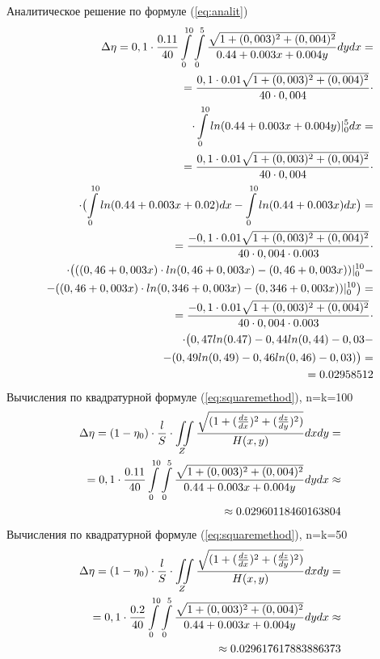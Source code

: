 \documentclass{article}
\begin{document}
Аналитическое решение по формуле (\ref{eq:analit})
\begin{align}\label{eq:analit1:max}
\Delta \eta = 0,1 \cdot \frac{0.11}{40} \int\limits_0^{10} \int\limits_0^5 \frac{\sqrt{1+(0,003)^2+(0,004)^2}}{0.44 + 0.003x + 0.004y} dy dx = \notag \\
= \frac{0,1 \cdot 0.01\sqrt{1+(0,003)^2+(0,004)^2}}{40 \cdot 0,004} \cdot \notag \\
\cdot \int\limits_0^{10} ln(0.44 + 0.003x + 0.004y)|_0^5 dx = \notag \\
= \frac{0,1 \cdot 0.01\sqrt{1+(0,003)^2+(0,004)^2}}{40 \cdot 0,004} \cdot \notag \\
\cdot \bigl(\int\limits_0^{10} ln(0.44 + 0.003x + 0.02)dx - \int\limits_0^{10} ln(0.44 + 0.003x)dx \bigr) = \notag \\
= \frac{-0,1 \cdot 0.01\sqrt{1+(0,003)^2+(0,004)^2}}{40 \cdot 0,004 \cdot 0.003} \cdot \notag \\
\cdot \bigl(((0,46+0,003x) \cdot ln(0,46+0,003x) - (0,46+0,003x))|_0^{10} - \notag \\
- ((0,46+0,003x) \cdot ln(0,346+0,003x) - (0,346+0,003x))|_0^{10}\bigr) = \notag \\
= \frac{-0,1 \cdot 0.01\sqrt{1+(0,003)^2+(0,004)^2}}{40 \cdot 0,004 \cdot 0.003} \cdot \notag \\
\cdot \bigl(0,47 ln(0.47)-0,44ln(0,44)-0,03- \notag \\
- (0,49ln(0,49)-0,46ln(0,46)-0,03)\bigr) = \notag \\
= 0.02958512
\end{align}
Вычисления по квадратурной формуле (\ref{eq:squaremethod}), n=k=100
\begin{align}\label{eq:sq1max10}
\Delta \eta = (1- \eta_0) \cdot \frac{l}{S} \cdot \iint\limits_Z \frac{\sqrt{(1+(\frac{dz}{dx})^2+ (\frac{dz}{dy})^2)}}{H(x,y)}dxdy = \notag \\
= 0,1 \cdot \frac{0.11}{40} \int\limits_0^{10} \int\limits_0^5 \frac{\sqrt{1+(0,003)^2+(0,004)^2}}{0.44 + 0.003x + 0.004y} dy dx \approx \notag \\
\approx 0.02960118460163804
\end{align}
Вычисления по квадратурной формуле (\ref{eq:squaremethod}), n=k=50
\begin{align}\label{eq:sq1max5}
\Delta \eta = (1- \eta_0) \cdot \frac{l}{S} \cdot \iint\limits_Z \frac{\sqrt{(1+(\frac{dz}{dx})^2+ (\frac{dz}{dy})^2)}}{H(x,y)}dxdy = \notag \\
= 0,1 \cdot \frac{0.2}{40} \int\limits_0^{10} \int\limits_0^5 \frac{\sqrt{1+(0,003)^2+(0,004)^2}}{0.44 + 0.003x + 0.004y} dy dx \approx \notag \\ 
\approx 0.029617617883886373
\end{align}
\end{document}
